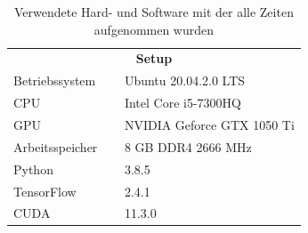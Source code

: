 \begin{table}
	\centering
	\begin{tabular}{ll}
		\multicolumn{2}{c}{\textbf{Setup}} \\[5pt]
		Betriebssystem $\quad$& Ubuntu 20.04.2.0 LTS \\
		CPU & Intel Core  i5-7300HQ \\
		GPU & NVIDIA Geforce GTX 1050 Ti \\
		Arbeitsspeicher & 8 GB DDR4 2666 MHz \\
		Python & 3.8.5 \\
		TensorFlow & 2.4.1 \\
		CUDA & 11.3.0 \\
	\end{tabular}
	\caption{Verwendete Hard- und Software mit der alle Zeiten aufgenommen wurden}
	\label{hardware}
\end{table}

